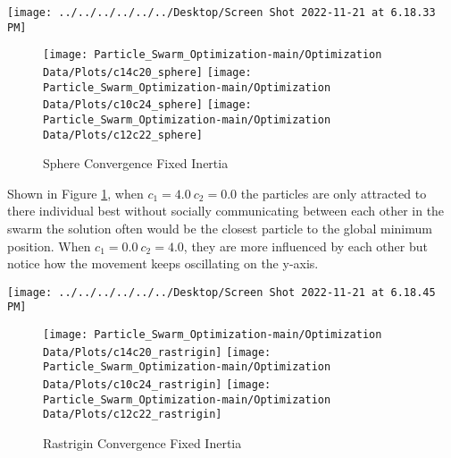 \documentclass[
]{article}
\begin{document}
\begin{center}\texttt{[image: ../../../../../../Desktop/Screen Shot 2022-11-21 at 6.18.33 PM]} \end{center}

\begin{figure}[H]

{\centering \texttt{[image: Particle\_Swarm\_Optimization-main/Optimization Data/Plots/c14c20\_sphere]} \texttt{[image: Particle\_Swarm\_Optimization-main/Optimization Data/Plots/c10c24\_sphere]} \texttt{[image: Particle\_Swarm\_Optimization-main/Optimization Data/Plots/c12c22\_sphere]} 

}

\caption{Sphere Convergence Fixed Inertia \label{fig:sphereconvergencefw}}\label{fig:sphereconvergencefw}
\end{figure}

Shown in Figure \ref{fig:sphereconvergencefw}, when
\(c_1=4.0\: c_2=0.0\) the particles are only attracted to there
individual best without socially communicating between each other in the
swarm the solution often would be the closest particle to the global
minimum position. When \(c_1=0.0\: c_2=4.0\), they are more influenced
by each other but notice how the movement keeps oscillating on the
y-axis.

\begin{center}\texttt{[image: ../../../../../../Desktop/Screen Shot 2022-11-21 at 6.18.45 PM]} \end{center}

\begin{figure}[H]

{\centering \texttt{[image: Particle\_Swarm\_Optimization-main/Optimization Data/Plots/c14c20\_rastrigin]} \texttt{[image: Particle\_Swarm\_Optimization-main/Optimization Data/Plots/c10c24\_rastrigin]} \texttt{[image: Particle\_Swarm\_Optimization-main/Optimization Data/Plots/c12c22\_rastrigin]} 

}

\caption{Rastrigin Convergence Fixed Inertia \label{fig:rastriginconvergencefw}}\label{fig:rastriginconvergencefw}
\end{figure}
\end{document}

